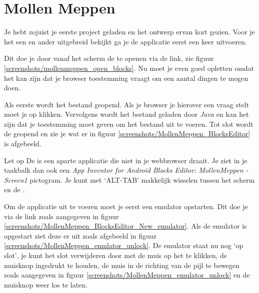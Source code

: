 \chapter{Mollen Meppen}

Je hebt zojuist je eerste project geladen en het ontwerp ervan kort gezien. Voor je het een en ander uitgebreid bekijkt ga je de applicatie eerst een keer uitvoeren.

Dit doe je door vanaf het  scherm de  te openen via de  link, zie figuur \ref{screenshots/mollenmeppen_open_blocks}. Nu moet je even goed opletten omdat het kan zijn dat je browser toestemming vraagt om een aantal dingen te mogen doen.


Als eerste wordt het  bestand geopend. Als je browser je hierover een vraag stelt moet je op  klikken. Vervolgens wordt het bestand geladen door \emph{Java} en kan het zijn dat je toestemming moet geven om het bestand uit te voeren. Tot slot wordt de  geopend en zie je wat er in figuur \ref{screenshots/MollenMeppen_BlocksEditor} is afgebeeld.


\begin{derivation}{Let op}
De  is een aparte applicatie die niet in je webbrowser draait. Je ziet in je taakbalk dan ook een \emph{App Inventor for Android Blocks Editor: MollenMeppen - Screen1} pictogram. Je kunt met `ALT-TAB' makkelijk wisselen tussen het  scherm en de .
\end{derivation}

Om de applicatie uit te voeren moet je eerst een emulator opstarten. Dit doe je via de  link zoals aangegeven in figuur \ref{screenshots/MollenMeppen_BlocksEditor_New_emulator}. Als de emulator is opgestart ziet deze er uit zoals afgebeeld in figuur \ref{screenshots/MollenMeppen_emulator_unlock}. De emulator staat nu nog `op slot', je kunt het slot verwijderen door met de muis op het  te klikken, de muisknop ingedrukt te houden, de muis in de richting van de pijl te bewegen zoals aangegeven in figuur \ref{screenshots/MollenMeppen_emulator_unlock} en de muisknop weer los te laten.

